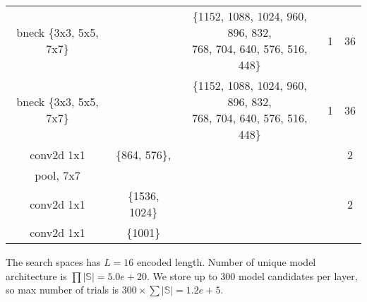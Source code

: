 \begin{table}
\begin{center}
\begin{tabular}[hp]{c|c|c|c|c}
  bneck \{3x3, 5x5, 7x7\} & &\shortstack{\{1152, 1088, 1024, 960, 896, 832, \\ 768, 704, 640, 576, 516, 448\}} &1 &36 \\
  bneck \{3x3, 5x5, 7x7\} & &\shortstack{\{1152, 1088, 1024, 960, 896, 832, \\ 768, 704, 640, 576, 516, 448\}} &1 &36 \\
\hline
  conv2d 1x1 &\{864, 576\}, & & &2\\
  pool, 7x7  & & &\\
  conv2d 1x1  &\{1536, 1024\} & & &2\\
  conv2d 1x1 &\{1001\} & & \\
\hline
\hline

\end{tabular}
\end{center}
\end{table}

The search spaces has $L=16$ encoded length. Number of unique model architecture is $\prod |\mathbb{S}| = 5.0e+20$.
We store up to 300 model candidates per layer, so max number of trials is $300 \times {\sum{|\mathbb{S}|}} = 1.2e+5$.


